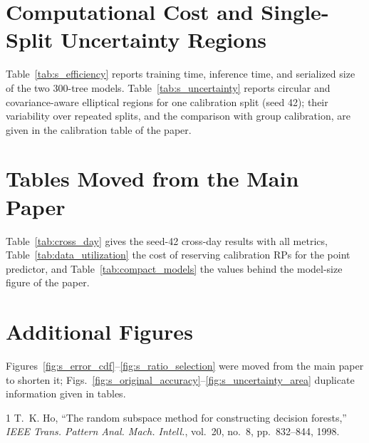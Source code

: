 \documentclass[10pt]{article}
\begin{document}
\section{Computational Cost and Single-Split Uncertainty Regions}

Table~\ref{tab:s_efficiency} reports training time, inference time, and serialized size of the two 300-tree models. Table~\ref{tab:s_uncertainty} reports circular and covariance-aware elliptical regions for one calibration split (seed 42); their variability over repeated splits, and the comparison with group calibration, are given in the calibration table of the paper.

\section{Tables Moved from the Main Paper}

Table~\ref{tab:cross_day} gives the seed-42 cross-day results with all metrics, Table~\ref{tab:data_utilization} the cost of reserving calibration RPs for the point predictor, and Table~\ref{tab:compact_models} the values behind the model-size figure of the paper.

\section{Additional Figures}

Figures~\ref{fig:s_error_cdf}--\ref{fig:s_ratio_selection} were moved from the main paper to shorten it; Figs.~\ref{fig:s_original_accuracy}--\ref{fig:s_uncertainty_area} duplicate information given in tables.





\clearpage


\begin{thebibliography}{1}
T.~K. Ho, ``The random subspace method for constructing decision forests,'' \emph{IEEE Trans. Pattern Anal. Mach. Intell.}, vol.~20, no.~8, pp.~832--844, 1998.
\end{thebibliography}
\end{document}
